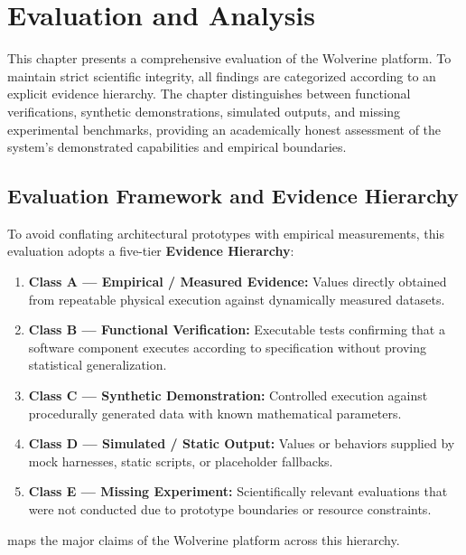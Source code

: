 \chapter{Evaluation and Analysis}
\label{ch:evaluation}

This chapter presents a comprehensive evaluation of the Wolverine platform. To maintain strict scientific integrity, all findings are categorized according to an explicit evidence hierarchy. The chapter distinguishes between functional verifications, synthetic demonstrations, simulated outputs, and missing experimental benchmarks, providing an academically honest assessment of the system's demonstrated capabilities and empirical boundaries.

\section{Evaluation Framework and Evidence Hierarchy}
\label{sec:eval-framework}
To avoid conflating architectural prototypes with empirical measurements, this evaluation adopts a five-tier \textbf{Evidence Hierarchy}:

\begin{enumerate}
    \item \textbf{Class A --- Empirical / Measured Evidence:} Values directly obtained from repeatable physical execution against dynamically measured datasets.
    \item \textbf{Class B --- Functional Verification:} Executable tests confirming that a software component executes according to specification without proving statistical generalization.
    \item \textbf{Class C --- Synthetic Demonstration:} Controlled execution against procedurally generated data with known mathematical parameters.
    \item \textbf{Class D --- Simulated / Static Output:} Values or behaviors supplied by mock harnesses, static scripts, or placeholder fallbacks.
    \item \textbf{Class E --- Missing Experiment:} Scientifically relevant evaluations that were not conducted due to prototype boundaries or resource constraints.
\end{enumerate}

 maps the major claims of the Wolverine platform across this hierarchy.

